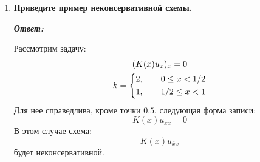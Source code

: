 \documentclass[12pt, a4paper]{article}
\begin{document}
	\begin{enumerate}
		\item \textbf{Приведите пример неконсервативной схемы.}
		\vspace*{0.2cm}
		
		\textit{\textbf{Ответ:}}
		
		Рассмотрим задачу: 
		\begin{gather}
			(K(x) u_x)_x = 0 \notag \\
			k = \begin{dcases}
				2, \qquad 0 \le x < 1/2 \\
				1 , \qquad 1/2 \le x < 1 \\
			 \end{dcases}
		\end{gather}
		Для нее справедлива, кроме точки $0.5$, следующая форма записи:
		\[K(x)u_{xx} = 0\]
		В этом случае схема:
		\[
		K(x)u_{\overline{x}x}
		\]
		будет неконсервативной.
	\end{enumerate}
	
\end{document}
